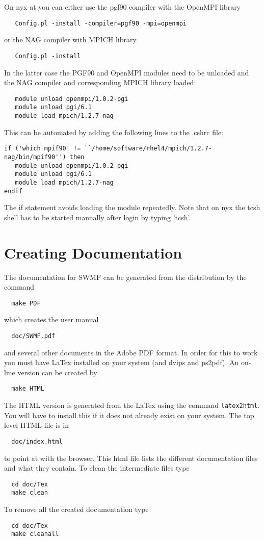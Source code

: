 On nyx at you can either use the pgf90 compiler with the OpenMPI library
\begin{verbatim}
   Config.pl -install -compiler=pgf90 -mpi=openmpi
\end{verbatim}
or the NAG compiler with MPICH library
\begin{verbatim}
   Config.pl -install
\end{verbatim}
In the latter case the PGF90 and OpenMPI modules need to be 
unloaded and the NAG compiler and corresponding MPICH library loaded:
\begin{verbatim}
   module unload openmpi/1.0.2-pgi
   module unload pgi/6.1
   module load mpich/1.2.7-nag
\end{verbatim}
This can be automated by adding the following lines to the .cshrc file:
\begin{verbatim}
if ('which mpif90' != ``/home/software/rhel4/mpich/1.2.7-nag/bin/mpif90'') then
   module unload openmpi/1.0.2-pgi
   module unload pgi/6.1
   module load mpich/1.2.7-nag
endif
\end{verbatim}
The if statement avoids loading the module repeatedly.
Note that on nyx the tcsh shell has to be started manually after login
by typing 'tcsh'.

\section{Creating Documentation}

The documentation for SWMF can be generated from the distribution by
the command
\begin{verbatim}
  make PDF
\end{verbatim}
which creates the user manual
\begin{verbatim}
  doc/SWMF.pdf
\end{verbatim}
and several other documents in the Adobe PDF format.  
In order for this to work you must have
LaTex installed on your system (and dvips and ps2pdf).  
An on-line version can be created by
\begin{verbatim}
  make HTML
\end{verbatim}
The HTML version is generated from the LaTex using the command 
{\tt latex2html}.
You will have to install this if it does not already exist on your system.
The top level HTML file is in
\begin{verbatim}
  doc/index.html
\end{verbatim}
to point at with the browser.  This html file lists the different
documentation files and what they contain.  
To clean the intermediate files type
\begin{verbatim}
  cd doc/Tex
  make clean
\end{verbatim}
To remove all the created documentation type
\begin{verbatim}
  cd doc/Tex
  make cleanall
\end{verbatim}

